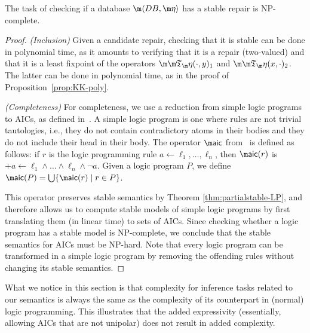 \begin{proposition}
  The task of checking if a database $\fulldb$ has a stable repair is NP-complete.
\end{proposition}
\begin{proof}
  \emph{(Inclusion)} Given a candidate repair, checking that it is stable can be done in polynomial time, as it amounts to verifying that it is a repair (two-valued) and that it is a least fixpoint of the operators $\Ap(\cdot,y)_1$ and $\Ap(x,\cdot)_2$.
  The latter can be done in polynomial time, as in the proof of Proposition~\ref{prop:KK-poly}.

  \emph{(Completeness)} For completeness, we use a reduction from simple logic programs to AICs, as defined in~\cite{tplp/CaropreseT11}.
  A simple logic program is one where rules are not trivial tautologies, i.e., they do not contain contradictory atoms in their bodies and they do not include their head in their body.
  The operator $\aicop$ from~\cite{tplp/CaropreseT11} is defined as follows: if $r$ is the logic programming rule $a\leftarrow \ell_1,\ldots,\ell_n$, then $\aicop(r)$ is ${+a}\leftarrow \ell_1\wedge\ldots\wedge\ell_n\wedge\neg a$.
  Given a logic program $P$, we define $\aicop(P)=\bigcup\{\aicop(r)\mid r\in P\}$.

  This operator preserves stable semantics by Theorem \ref{thm:partialstable-LP}, and therefore allows us to compute stable models of simple logic programs by first translating them (in linear time) to sets of AICs.
  Since checking whether a logic program has a stable model is NP-complete, we conclude that the stable semantics for AICs must be NP-hard.
  Note that every logic program can be transformed in a simple logic program by removing the offending rules without changing its stable semantics.
\end{proof}

What we notice in this section is that complexity for inference tasks related to our semantics is always the same as the complexity of its counterpart in (normal) logic programming. 
This illustrates that the added expressivity (essentially, allowing AICs that are not unipolar) does not result in added complexity. 



